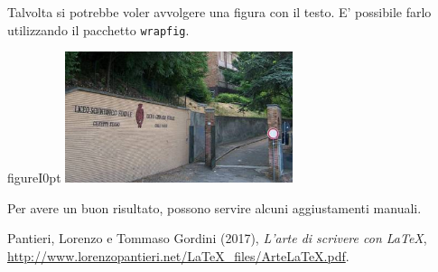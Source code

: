 \documentclass[a4paper,11pt]{article}
\begin{document}
Talvolta si potrebbe voler avvolgere una figura con il testo.
E' possibile farlo utilizzando il pacchetto \verb!wrapfig!.

\begin{wrapfloat}{figure}{I}{0pt}
\includegraphics[width=0.5\textwidth]{peano.jpeg}
\end{wrapfloat}
Per avere un buon risultato, possono servire
alcuni aggiustamenti manuali.

\lipsum[1]


\begin{thebibliography}{9}
Pantieri, Lorenzo e Tommaso Gordini (2017),
\emph{L’arte di scrivere con \LaTeX},
\url{http://www.lorenzopantieri.net/LaTeX_files/ArteLaTeX.pdf}.
\end{thebibliography}
\end{document}
